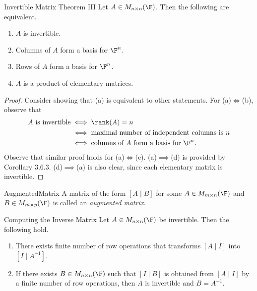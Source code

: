 \documentclass[linearalgebra]{subfiles}
\begin{document}
    \clearpage
    \begin{theorem}{Invertible Matrix Theorem III}
        Let $A\in M_{n\times n}(\F)$. Then the following are equivalent.
        \begin{enumerate}
            \item $A$ is invertible.
            \item Columns of $A$ form a basis for $\F^n$.
            \item Rows of $A$ form a basis for $\F^n$.
            \item $A$ is a product of elementary matrices.
        \end{enumerate}
    \end{theorem}

    \begin{proof}
        Consider showing that (a) is equivalent to other statements. For (a)$\iff$(b), observe that
        \begin{align*}
            A\text{ is invertible} & \iff \rank(A) = n \\
                                   & \iff \text{maximal number of independent columns is }n \\
                                   & \iff \text{columns of }A\text{ form a basis for }\F^n.
        \end{align*}
        Observe that similar proof holds for (a)$\iff$(c). (a)$\implies$(d) is provided by Corollary 3.6.3. (d)$\implies$(a) is also clear, since each elementary matrix is invertible. 
    \end{proof}

    \begin{definition}{Augmented}{Matrix}
        A matrix of the form $\left[ A\mid B \right]$ for some $A\in M_{m\times n}(\F)$ and $B\in M_{m\times p}(\F)$ is called an \emph{augmented matrix}.  
    \end{definition}

    \begin{prop}{Computing the Inverse Matrix}
        Let $A\in M_{n\times n}(\F)$ be invertible. Then the following hold.
        \begin{enumerate}
            \item There exists finite number of row operations that transforms $[A\mid I]$ into $[I\mid A^{-1}]$.
            \item If there exists $B\in M_{n\times n}(\F)$ such that $[I\mid B]$ is obtained from $[A\mid I]$ by a finite number of row operations, then $A$ is invertible and $B = A^{-1}$.
        \end{enumerate}
    \end{prop}
\end{document}
